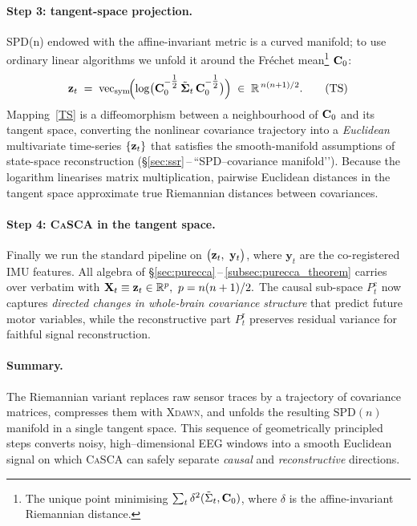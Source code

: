 \documentclass[14pt]{extarticle}
\begin{document}
	\paragraph{Step 3: tangent-space projection.}
	SPD(n) endowed with the affine-invariant metric is a curved manifold;
	to use ordinary linear algorithms we unfold it around the Fréchet
	mean\footnote{The unique point minimising
		$\sum_t \delta^2(\tilde{\Sigma}_t,\mathbf{C}_0)$, where
		$\delta$ is the affine-invariant Riemannian distance.}
	$\mathbf{C}_0$:
	\[
	\mathbf{z}_t
	\;=\;
	\operatorname{vec}_{\mathrm{sym}}\!
	\Bigl(
	\log\bigl(\mathbf{C}_0^{-\tfrac12}\,
	\tilde{\boldsymbol{\Sigma}}_t\,
	\mathbf{C}_0^{-\tfrac12}\bigr)
	\Bigr)
	\;\in\;
	\mathbb{R}^{\,n(n+1)/2}.
	\tag{TS}
	\]
	Mapping~\eqref{TS} is a diffeomorphism between a neighbourhood of
	$\mathbf{C}_0$ and its tangent space, converting the nonlinear covariance
	trajectory into a \emph{Euclidean} multivariate time-series
	$\{\mathbf{z}_t\}$ that satisfies the smooth-manifold assumptions of
	state-space reconstruction (\S\ref{sec:ssr}\,–\,“SPD–covariance
	manifold’’).  Because the logarithm linearises matrix multiplication,
	pairwise Euclidean distances in the tangent space approximate true
	Riemannian distances between covariances.
	
	\paragraph{Step 4: \textsc{CaSCA} in the tangent space.}
	Finally we run the standard pipeline on
	$\bigl(\mathbf{z}_t,\ \mathbf y_t\bigr)$, where $\mathbf y_t$ are the
	co-registered IMU features.  All algebra of
	\S\ref{sec:purecca}\,–\,\ref{subsec:purecca_theorem} carries over
	verbatim with
	\(
	\mathbf{X}_t\equiv\mathbf{z}_t\in\mathbb{R}^{p},\ p=n(n+1)/2.
	\)
	The causal sub-space $P_t^{\mathrm c}$ now captures \emph{directed
		changes in whole-brain covariance structure} that predict future motor
	variables, while the reconstructive part $P_t^{\mathrm r}$ preserves
	residual variance for faithful signal reconstruction.
	
	\paragraph{Summary.}
	The Riemannian variant replaces raw sensor traces by a trajectory of covariance
	matrices, compresses them with \textsc{Xdawn}, and unfolds the resulting
	$\mathrm{SPD}(n)$ manifold in a single tangent space.
	This sequence of geometrically principled steps converts noisy,
	high–dimensional EEG windows into a smooth Euclidean signal on which
	\textsc{CaSCA} can safely separate \emph{causal} and
	\emph{reconstructive} directions.
	
\end{document}
